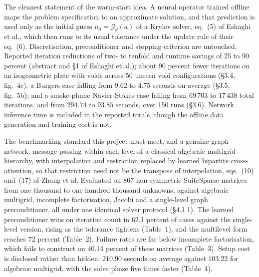 \documentclass[11pt, a4paper]{article}
\begin{document}
\begin{description}[style=nextline]
  \item[Eshaghi et al., neural operator warm starts, NOWS~\citep{nows}]
  The cleanest statement of the warm-start idea. A neural operator trained
  offline maps the problem specification to an approximate solution, and that
  prediction is used only as the initial guess $u_0 = \mathcal{G}_\theta(a)$
  of a Krylov solver, eq.~(5) of Eshaghi et al., which then runs to its usual
  tolerance under the update rule of their eq.~(6). Discretisation,
  preconditioner and stopping criterion are untouched. Reported iteration
  reductions of two- to tenfold and runtime savings of 25 to 90 percent
  (abstract and \S{}1 of Eshaghi et al.); about 90 percent fewer iterations on
  an isogeometric plate with voids across 50 unseen void configurations
  (\S{}3.4, fig.~4c); a Burgers case falling from $9.62$ to $4.75$ seconds on
  average (\S{}3.5, fig.~5b); and a smoke-plume Navier-Stokes case falling from
  $69\,703$ to $17\,438$ total iterations, and from $294.74$ to $93.85$
  seconds, over 150 runs (\S{}3.6). Network inference time is included in the
  reported totals, though the offline data generation and training cost is
  not.
  \item[Zhang, Li and Saad, graph neural multilevel
  preconditioners~\citep{gnnprecond}]
  The benchmarking standard this project must meet, and a genuine graph
  network: message passing within each level of a classical algebraic
  multigrid hierarchy, with interpolation and restriction replaced by learned
  bipartite cross-attention, so that restriction need not be the transpose of
  interpolation, eqs.~(10) and~(17) of Zhang et al. Evaluated on 867
  non-symmetric SuiteSparse matrices from one thousand to one hundred
  thousand unknowns, against algebraic multigrid, incomplete factorisation,
  Jacobi and a single-level graph preconditioner, all under one identical
  solver protocol (\S{}4.1.1). The learned preconditioner wins on iteration
  count in 62.1 percent of cases against the single-level version, rising as
  the tolerance tightens (Table~1), and the multilevel form reaches 72
  percent (Table~2). Failure rates are far below incomplete factorisation,
  which fails to construct on 40.14 percent of these matrices (Table~3).
  Setup cost is disclosed rather than hidden: $210.90$ seconds on average
  against $103.22$ for algebraic multigrid, with the solve phase five times
  faster (Table~4).
  \item[Arisaka and Li, non-intrusive meta-solving~\citep{metasolving}]

\end{description}
\end{document}
